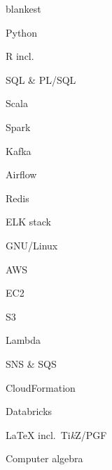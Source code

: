 \documentclass[%
version=last,%
fontsize=11pt,%
paper=A4,%
headinclude=false,%
footinclude=false,%
headlines=0,%
footlines=0,%
areasetadvanced,%
toc=bibnumbered,%
]{scrartcl}%
\begin{document}
\begin{minipage}[t]{.4\textwidth}
  \begin{UniformTCBRaster}{2}
    \begin{tcboxedraster}[raster columns=1]{blankest}
      \begin{TCBItems}
      \item Python
      \item R incl.\ 
      \item SQL \& PL/SQL
      \item Scala
      \end{TCBItems}
      \begin{tcolorbox}
        \begin{minipage}[t]{0.45\linewidth}
          \begin{Items}
          \item Spark
          \item Kafka
          \item Airflow
          \end{Items}
        \end{minipage}%
        \hfill%
        \begin{minipage}[t]{0.55\linewidth}
          \begin{Items}
          \item Redis
          \item ELK stack
          \end{Items}
        \end{minipage}
      \end{tcolorbox}
    \end{tcboxedraster}
    \begin{TCBItems}
    \item GNU/Linux
    \item AWS
      \begin{Items}
      \item EC2
      \item S3
      \item Lambda
      \item SNS \& SQS
      \item CloudFormation
      \end{Items}
    \item Databricks
    \end{TCBItems}
    \begin{tcolorbox}
      \LaTeX{} incl.\ Ti\emph{k}Z/PGF
    \end{tcolorbox}
    \begin{tcolorbox}
      Computer algebra
    \end{tcolorbox}
  \end{UniformTCBRaster}


\end{minipage}
\end{document}
